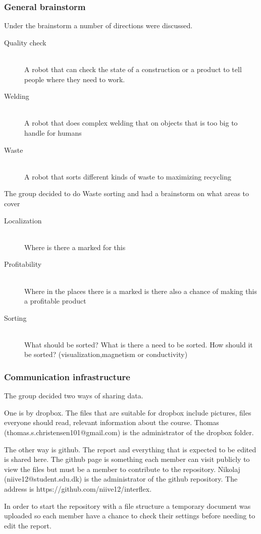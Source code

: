 \subsubsection{General brainstorm}
Under the brainstorm a number of directions were discussed.
\begin{description}
\item[Quality check] \hfill \\
A robot that can check the state of a construction or a product to tell people where they need to work.
\item[Welding] \hfill \\
A robot that does complex welding that on objects that is too big to handle for humans
\item[Waste] \hfill \\
A robot that sorts different kinds of waste to maximizing recycling
\end{description}
The group decided to do Waste sorting and had a brainstorm on what areas to cover
\begin{description}
\item[Localization] \hfill \\
Where is there a marked for this
\item[Profitability] \hfill \\
Where in the places there is a marked is there also a chance of making this a profitable product
\item[Sorting] \hfill \\
What should be sorted? What is there a need to be sorted.
How should it be sorted? (visualization,magnetism or conductivity)
\end{description}

\subsubsection{Communication infrastructure}
The group decided two ways of sharing data.

One is by dropbox. The files that are suitable for dropbox include pictures, files everyone should read, relevant information about the course.
Thomas (thomas.s.christensen101@gmail.com) is the administrator of the dropbox folder.

The other way is github. The report and everything that is expected to be edited is shared here.
The github page is something each member can visit publicly to view the files but must be a member to contribute to the repository.
Nikolaj (niive12@student.sdu.dk) is the administrator of the github repository.
The address is https://github.com/niive12/interflex.

In order to start the repository with a file structure a temporary document was uploaded so each member have a chance to check their settings before needing to edit the report.
